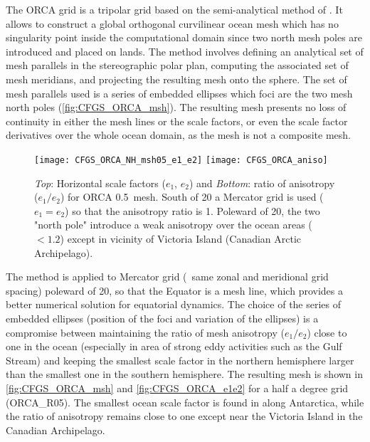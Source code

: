 \documentclass[../main/NEMO_manual]{subfiles}
\begin{document}
The ORCA grid is a tripolar grid based on the semi-analytical method of \citet{madec.imbard_CD96}.
It allows to construct a global orthogonal curvilinear ocean mesh which has no singularity point inside
the computational domain since two north mesh poles are introduced and placed on lands.
The method involves defining an analytical set of mesh parallels in the stereographic polar plan,
computing the associated set of mesh meridians, and projecting the resulting mesh onto the sphere.
The set of mesh parallels used is a series of embedded ellipses which foci are the two mesh north poles
(\autoref{fig:CFGS_ORCA_msh}).
The resulting mesh presents no loss of continuity in either the mesh lines or the scale factors,
or even the scale factor derivatives over the whole ocean domain, as the mesh is not a composite mesh.
\begin{figure}[!tbp]
  \centering
  \texttt{[image: CFGS\_ORCA\_NH\_msh05\_e1\_e2]}
  \texttt{[image: CFGS\_ORCA\_aniso]}
  \caption[Horizontal scale factors and ratio of anisotropy for ORCA 0.5\deg\ mesh]{
    \textit{Top}: Horizontal scale factors ($e_1$, $e_2$) and
    \textit{Bottom}: ratio of anisotropy ($e_1 / e_2$)
    for ORCA 0.5\deg\ mesh.
    South of 20 a Mercator grid is used ($e_1 = e_2$) so that the anisotropy ratio is 1.
    Poleward of 20,
    the two "north pole" introduce a weak anisotropy over the ocean areas ($< 1.2$) except in
    vicinity of Victoria Island (Canadian Arctic Archipelago).}
  \label{fig:CFGS_ORCA_e1e2}
\end{figure}

The method is applied to Mercator grid (\ie\ same zonal and meridional grid spacing) poleward of 20,
so that the Equator is a mesh line, which provides a better numerical solution for equatorial dynamics.
The choice of the series of embedded ellipses (position of the foci and variation of the ellipses)
is a compromise between maintaining the ratio of mesh anisotropy ($e_1 / e_2$) close to one in the ocean
(especially in area of strong eddy activities such as the Gulf Stream) and keeping the smallest scale factor in
the northern hemisphere larger than the smallest one in the southern hemisphere.
The resulting mesh is shown in \autoref{fig:CFGS_ORCA_msh} and \autoref{fig:CFGS_ORCA_e1e2} for
a half a degree grid (ORCA\_R05).
The smallest ocean scale factor is found in along Antarctica,
while the ratio of anisotropy remains close to one except near the Victoria Island in the Canadian Archipelago.
\end{document}
